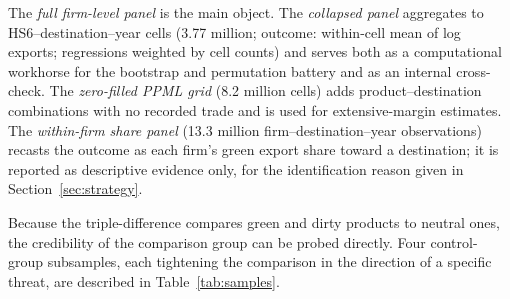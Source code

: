 \documentclass[12pt]{article}
\begin{document}
The \emph{full firm-level panel} is the main object. The \emph{collapsed panel} aggregates
to HS6--destination--year cells (3.77 million; outcome: within-cell mean of log exports;
regressions weighted by cell counts) and serves both as a computational workhorse for the
bootstrap and permutation battery and as an internal cross-check. The
\emph{zero-filled PPML grid} (8.2 million cells) adds product--destination combinations
with no recorded trade and is used for extensive-margin estimates. The \emph{within-firm
share panel} (13.3 million firm--destination--year observations) recasts the outcome as
each firm's green export share toward a destination; it is reported as descriptive
evidence only, for the identification reason given in Section~\ref{sec:strategy}.

Because the triple-difference compares green and dirty products to neutral ones, the
credibility of the comparison group can be probed directly. Four control-group subsamples,
each tightening the comparison in the direction of a specific threat, are described in
Table~\ref{tab:samples}.
\end{document}
